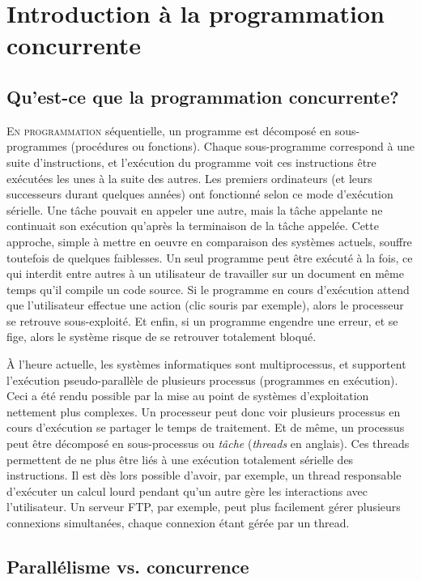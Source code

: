 \chapter{Introduction à la programmation concurrente}\label{sec:into}
\startchapter

\section{Qu'est-ce que la programmation concurrente?}


\lettrine[lines=4]{E}{n programmation} séquentielle, un programme est décomposé en sous-programmes (procédures ou fonctions). Chaque sous-programme correspond à une suite d'instructions, et l'exécution du programme voit ces instructions être exécutées les unes à la suite des autres. Les premiers ordinateurs (et leurs successeurs durant quelques années) ont fonctionné selon ce mode d'exécution sérielle. Une tâche pouvait en appeler une autre, mais la tâche appelante ne continuait son exécution qu'après la terminaison de la tâche appelée. Cette approche, simple à mettre en oeuvre en comparaison des systèmes actuels, souffre toutefois de quelques faiblesses. Un seul programme peut être exécuté à la fois, ce qui interdit entre autres à un utilisateur de travailler sur un document en même temps qu'il compile un code source. Si le programme en cours d'exécution attend que l'utilisateur effectue une action (clic souris par exemple), alors le processeur se retrouve sous-exploité. Et enfin, si un programme engendre une erreur, et se fige, alors le système risque de se retrouver totalement bloqué.

À l'heure actuelle, les systèmes informatiques sont multiprocessus, et supportent l'exécution pseudo-parallèle de plusieurs processus (programmes en exécution). Ceci a été rendu possible par la mise au point de systèmes d'exploitation nettement plus complexes. Un processeur peut donc voir plusieurs processus en cours d'exécution se partager le temps de traitement. Et de même, un processus peut être décomposé en sous-processus ou \emph{tâche} (\emph{threads} en anglais). Ces threads permettent de ne plus être liés à une exécution totalement sérielle des instructions. Il est dès lors possible d'avoir, par exemple, un thread responsable d'exécuter un calcul lourd pendant qu'un autre gère les interactions avec l'utilisateur. Un serveur FTP, par exemple, peut plus facilement gérer plusieurs connexions simultanées, chaque connexion étant gérée par un thread.


\section{Parallélisme vs. concurrence}

